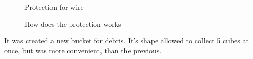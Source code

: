 \begin{figure}[H]
	\begin{minipage}[h]{0.47\linewidth}
		\caption{Protection for wire}
	\end{minipage}
	\hfill
	\begin{minipage}[h]{0.47\linewidth}
		\caption{How does the protection works}
	\end{minipage}
\end{figure}

It was created a new bucket for debris. It's shape allowed to collect 5 cubes at once, but was more convenient, than the previous.


